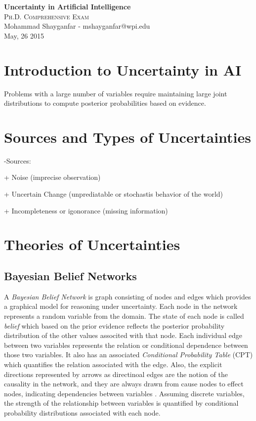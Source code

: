 \documentclass[11pt]{article}
\begin{document}

\begin{center}
{\LARGE{\textbf{Uncertainty in Artificial Intelligence}}} \\
\Large\textsc{Ph.D. Comprehensive Exam} \\[1em]
\large\textnormal{Mohammad Shayganfar - mshayganfar@wpi.edu} \\
\large\textnormal{May, 26 2015}
\end{center}

\section{Introduction to Uncertainty in AI}

Problems with a large number of variables require maintaining large joint
distributions to compute posterior probabilities based on evidence.

\section{Sources and Types of Uncertainties}

-Sources:

+ Noise (imprecise observation)

+ Uncertain Change (unprediatable or stochastis behavior of the world)

+ Incompleteness or igonorance (missing information)

\section{Theories of Uncertainties}

\subsection{Bayesian Belief Networks}

A \textit{Bayesian Belief Network} is graph consisting of nodes and edges which
provides a graphical model for reasoning under uncertainty. Each node in the
network represents a random variable from the domain. The state of each node is
called \textit{belief} which based on the prior evidence reflects the posterior
probability distribution of the other values associted with that node. Each
individual edge between two variables represents the relation or conditional
dependence between those two variables. It also has an associated
\textit{Conditional Probability Table} (CPT) which quantifies the relation
associated with the edge. Also, the explicit directions represented by arrows as
directinoal edges are the notion of the causality in the network, and they are
always drawn from cause nodes to effect nodes, indicating dependencies between
variables \cite{das:decision-making-agents}. Assuming discrete variables, the
strength of the relationship between variables is quantified by conditional
probability distributions associated with each node.
\end{document}
